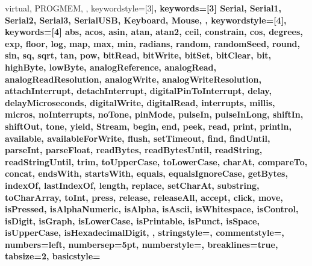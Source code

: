{{                 virtual, PROGMEM,
                 },  
   keywordstyle=[3]\bfseries\color{arduinoOrange},
   keywords=[3]{  %
                 Serial, Serial1, Serial2, Serial3, SerialUSB, Keyboard, Mouse,
                 },      
   keywordstyle=[4]\color{arduinoOrange},
   keywords=[4]{  %
                 abs, acos, asin, atan, atan2, ceil, constrain, cos, degrees, exp, 
                 floor, log, map, max, min, radians, random, randomSeed, round, sin, 
                 sq, sqrt, tan, pow, bitRead, bitWrite, bitSet, bitClear, bit, 
                 highByte, lowByte, analogReference, analogRead, 
                 analogReadResolution, analogWrite, analogWriteResolution, 
                 attachInterrupt, detachInterrupt, digitalPinToInterrupt, delay, 
                 delayMicroseconds, digitalWrite, digitalRead, interrupts, millis, 
                 micros, noInterrupts, noTone, pinMode, pulseIn, pulseInLong, shiftIn, 
                 shiftOut, tone, yield, Stream, begin, end, peek, read, print, 
                 println, available, availableForWrite, flush, setTimeout, find, 
                 findUntil, parseInt, parseFloat, readBytes, readBytesUntil, readString, 
                 readStringUntil, trim, toUpperCase, toLowerCase, charAt, compareTo, 
                 concat, endsWith, startsWith, equals, equalsIgnoreCase, getBytes, 
                 indexOf, lastIndexOf, length, replace, setCharAt, substring, 
                 toCharArray, toInt, press, release, releaseAll, accept, click, move, 
                 isPressed, isAlphaNumeric, isAlpha, isAscii, isWhitespace, isControl, 
                 isDigit, isGraph, isLowerCase, isPrintable, isPunct, isSpace, 
                 isUpperCase, isHexadecimalDigit, 
                 },      
   stringstyle=\color{arduinoDarkBlue},    
   commentstyle=\color{arduinoGrey},    
   numbers=left,                    
   numbersep=5pt,                   
   numberstyle=\color{arduinoBlack},    
   breaklines=true,                    %
   tabsize=2,         
   basicstyle=\ttfamily  
 }